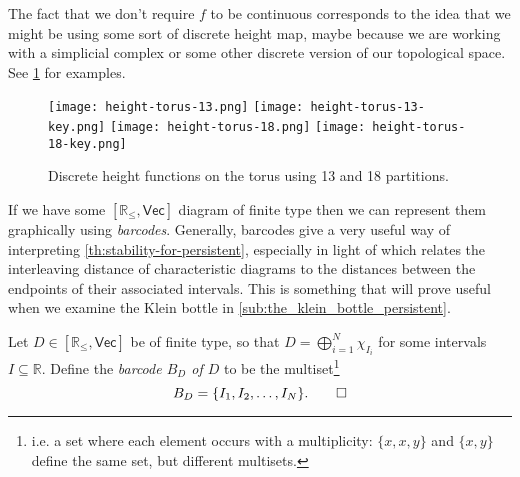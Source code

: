 \documentclass[12pt]{article}
\numberwithin{equation}{subsection}
\numberwithin{theorem}{subsection}
\numberwithin{lemma}{subsection}
\numberwithin{corollary}{subsection}
\numberwithin{definition}{subsection}
\numberwithin{example}{subsection}
\numberwithin{note}{subsection}
\newcommand{\rr}{\mathbb{R}}
\newcommand{\rrleq}{\rr_\leqslant}
\newcommand{\Vecrrdiag}{[\rr_\leqslant,\mathsf{Vec}]}
\begin{document}
            \begin{note}\label{nt:why-not-assumed-continuous}
                The fact that we don't require $f$ to be continuous corresponds to the idea that we might be using some sort of discrete height map, maybe because we are working with a simplicial complex or some other discrete version of our topological space.
                See \cref{fg:height-torus} for examples.
            \end{note}

            \begin{figure}[ht]
                \centering
                \texttt{[image: height-torus-13.png]}
                \texttt{[image: height-torus-13-key.png]}
                \hspace{.02\textwidth}
                \texttt{[image: height-torus-18.png]}
                \texttt{[image: height-torus-18-key.png]}
                \caption{Discrete height functions on the torus using 13 and 18 partitions.}\label{fg:height-torus}
            \end{figure}

            \bigskip

            If we have some $[\rrleq,\mathsf{Vec}]$ diagram of finite type then we can represent them graphically using \emph{barcodes}.
            Generally, barcodes give a very useful way of interpreting \cref{th:stability-for-persistent}, especially in light of \cite[Propositions~4.12,~4.13]{Bubenik:dn} which relates the interleaving distance of characteristic diagrams to the distances between the endpoints of their associated intervals.
            This is something that will prove useful when we examine the Klein bottle in \cref{sub:the_klein_bottle_persistent}.
            \begin{definition}[Barcodes]\label{df:barcode}
                Let $D\in\Vecrrdiag$ be of finite type, so that $D=\bigoplus_{i=1}^N\chi_{I_i}$ for some intervals $I\subseteq\rr$.
                Define the \emph{barcode $B_D$ of $D$} to be the multiset\footnote{
                    i.e. a set where each element occurs with a multiplicity: $\{x,x,y\}$ and $\{x,y\}$ define the same set, but different multisets.
                }
                \begin{equation*}
                    B_D = \{I_1,I_2,\ldots,I_N\}.\qedhere
                \end{equation*}
            \end{definition}
\end{document}
